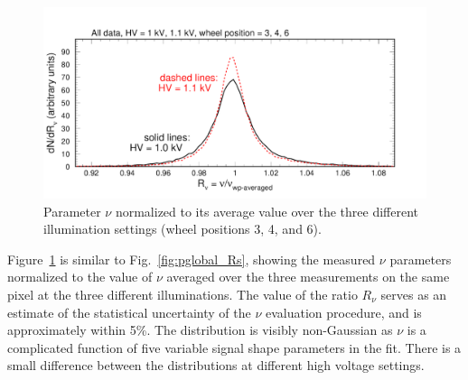 \begin{figure}[h!]
	\centering
	\includegraphics[width=0.98\linewidth, trim=0 12 50 35, clip]{figures/pglobal_Rn.pdf}
	\caption{Parameter $\nu$ normalized to its average value over the three different illumination settings (wheel positions 3, 4, and 6).}
	\label{fig:pglobal_Rn}
\end{figure}
Figure~\ref{fig:pglobal_Rn} is similar to Fig.~\ref{fig:pglobal_Rs}, showing the measured $\nu$ parameters normalized to the value of $\nu$ averaged over the three measurements on the same pixel at the three different illuminations. The value of the ratio $R_{\nu}$ serves as an estimate of the statistical uncertainty of the $\nu$ evaluation procedure, and is approximately within 5\%. The distribution is visibly non-Gaussian as $\nu$ is a complicated function of five variable signal shape parameters in the fit. There is a small difference between the distributions at different high voltage settings.

